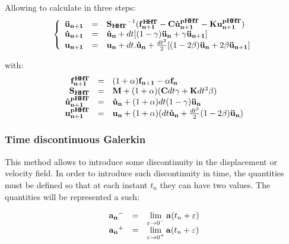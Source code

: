 \documentclass[12pt,a4paper]{article}
\begin{document}
\noindent
Allowing to calculate in three steps:
\begin{equation}
\label{Prediction}
	\left\{
		\begin{array}{r c l}
			\mathbf{\ddot{u}_{n+1}} 
			&=& \mathbf{ {S_{H\!H\!T}} }^{-1} (  \mathbf{f_{n+1}^{H\!H\!T} }
				- \mathbf{C} \mathbf{\dot{u}_{n+1}^{pH\!H\!T}} - \mathbf{K} \mathbf{u_{n+1}^{pH\!H\!T} } )
			\\ \mathbf{\dot{u}_{n+1}} &=& \mathbf{\dot{u}_n} 
				+ dt[(1-\gamma)\mathbf{\ddot{u}_n} + \gamma \mathbf{\ddot{u}_{n+1}}]
			\\ \mathbf{u_{n+1}} &=& \mathbf{u_n} + dt.\mathbf{\dot{u}_n}
				+ \frac{dt^2}{2}[(1-2\beta)\mathbf{\ddot{u}_n} + 2\beta\mathbf{\ddot{u}_{n+1}}]
		\end{array}
	\right.
\end{equation}

with:
\begin{equation}
		\begin{array}{r c l}
			\mathbf{f_{n+1}^{H\!H\!T}} &=& (1+\alpha)\mathbf{f_{n+1}}  - \alpha \mathbf{f_n}
		\\
			\mathbf{S_{H\!H\!T}} &=& \mathbf{M} + (1+ \alpha)(\mathbf{C} dt \gamma + \mathbf{K} dt^2 \beta)
		\\
			\mathbf{\dot{u}_{n+1}^{\mathbf{p}H\!H\!T} } &=& \mathbf{\dot{u}_n} + (1+\alpha) dt (1-\gamma) \mathbf{\ddot{u}_n}
		\\
			\mathbf{u_{n+1}^{pH\!H\!T} } &=& \mathbf{u_n} + (1+ \alpha)( dt \mathbf{\dot{u}_n} + \frac{dt^2}{2} (1-2\beta) \mathbf{\ddot{u}_n})
		\end{array}
\end{equation}

\subsubsection{Time discontinuous Galerkin}

This method allows to introduce some discontinuity in the displacement or velocity field. In order to introduce such discontinuity in time, the quantities must be defined so that at each instant $t_n$ they can have two values. The quantities will be represented a such:

\begin{equation}
	\begin{array}{r c l}
		\mathbf{a_n}^- 
		&=& \lim\limits_{\substack{\varepsilon \to 0^-}} \mathbf{a}(t_n+\varepsilon)
		\\ 
		\mathbf{a_n}^+ 
		&=& \lim\limits_{\substack{\varepsilon \to 0^+}} \mathbf{a}(t_n+\varepsilon)
	\end{array}
\end{equation}
\end{document}
